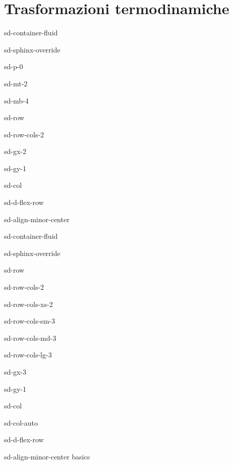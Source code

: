 \documentclass[letterpaper,10pt,english]{jupyterBook}
\begin{document}
\chapter{Trasformazioni termodinamiche}
\label{\detokenize{ch/thermodynamic_transformations:trasformazioni-termodinamiche}}\label{\detokenize{ch/thermodynamic_transformations:classical-thermodynamics-transformations}}\label{\detokenize{ch/thermodynamic_transformations::doc}}
\sphinxstepscope

\begin{sphinxuseclass}{sd-container-fluid}
\begin{sphinxuseclass}{sd-sphinx-override}
\begin{sphinxuseclass}{sd-p-0}
\begin{sphinxuseclass}{sd-mt-2}
\begin{sphinxuseclass}{sd-mb-4}
\begin{sphinxuseclass}{sd-row}
\begin{sphinxuseclass}{sd-row-cols-2}
\begin{sphinxuseclass}{sd-gx-2}
\begin{sphinxuseclass}{sd-gy-1}
\begin{sphinxuseclass}{sd-col}
\begin{sphinxuseclass}{sd-d-flex-row}
\begin{sphinxuseclass}{sd-align-minor-center}
\begin{sphinxuseclass}{sd-container-fluid}
\begin{sphinxuseclass}{sd-sphinx-override}
\begin{sphinxuseclass}{sd-row}
\begin{sphinxuseclass}{sd-row-cols-2}
\begin{sphinxuseclass}{sd-row-cols-xs-2}
\begin{sphinxuseclass}{sd-row-cols-sm-3}
\begin{sphinxuseclass}{sd-row-cols-md-3}
\begin{sphinxuseclass}{sd-row-cols-lg-3}
\begin{sphinxuseclass}{sd-gx-3}
\begin{sphinxuseclass}{sd-gy-1}
\begin{sphinxuseclass}{sd-col}
\begin{sphinxuseclass}{sd-col-auto}
\begin{sphinxuseclass}{sd-d-flex-row}
\begin{sphinxuseclass}{sd-align-minor-center}
\sphinxAtStartPar
basics


\end{sphinxuseclass}
\end{sphinxuseclass}
\end{sphinxuseclass}
\end{sphinxuseclass}
\end{sphinxuseclass}
\end{sphinxuseclass}
\end{sphinxuseclass}
\end{sphinxuseclass}
\end{sphinxuseclass}
\end{sphinxuseclass}
\end{sphinxuseclass}
\end{sphinxuseclass}
\end{sphinxuseclass}
\end{sphinxuseclass}
\end{sphinxuseclass}
\end{sphinxuseclass}
\end{sphinxuseclass}
\end{sphinxuseclass}
\end{sphinxuseclass}
\end{sphinxuseclass}
\end{sphinxuseclass}
\end{sphinxuseclass}
\end{sphinxuseclass}
\end{sphinxuseclass}
\end{sphinxuseclass}
\end{sphinxuseclass}
\end{document}
